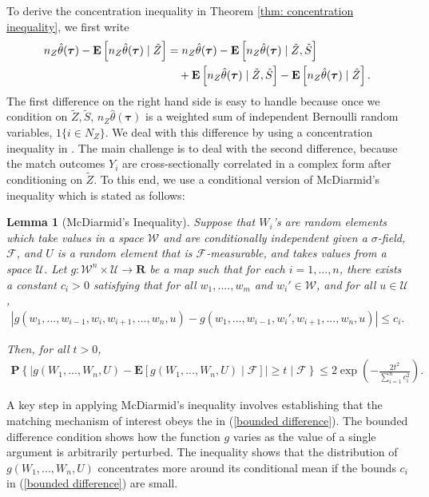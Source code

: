 \documentclass[12pt, fullpage]{amsart}
\newtheorem{lemma}{Lemma}[section]
\theoremstyle{definition}
\theoremstyle{definition}
\theoremstyle{definition}
\begin{document}
\begin{bibunit}[econometrica]
To derive the concentration inequality in Theorem \ref{thm: concentration inequality}, we first write 
\begin{align}
    \label{decomp}
    n_Z \hat \theta(\boldsymbol{\tau}) - \mathbf{E}\left[ n_Z \hat \theta(\boldsymbol{\tau})\mid \tilde Z \right] &= n_Z \hat \theta(\boldsymbol{\tau}) - \mathbf{E}\left[ n_Z \hat \theta(\boldsymbol{\tau})\mid \tilde Z,\tilde S \right]\\ \notag
    &\quad  + \mathbf{E}\left[ n_Z \hat \theta(\boldsymbol{\tau})\mid \tilde Z,\tilde S \right] - \mathbf{E}\left[ n_Z \hat \theta(\boldsymbol{\tau})\mid \tilde Z \right].
\end{align}
The first difference on the right hand side is easy to handle because once we condition on $\tilde Z,\tilde S$, $n_Z \hat \theta(\boldsymbol{\tau})$ is a weighted sum of independent Bernoulli random variables, $1\{i \in N_Z\}$. We deal with this difference by using a concentration inequality in \cite{Chung/Lu:AC:2002}. The main challenge is to deal with the second difference, because the match outcomes $Y_i$ are cross-sectionally correlated in a complex form after conditioning on $\tilde Z$. To this end, we use a conditional version of McDiarmid's inequality which is stated as follows:

\begin{lemma}[McDiarmid's Inequality]
	\label{lemm: McDiarmid's}
	Suppose that $W_i$'s are random elements which take values in a space $\mathcal{W}$ and are conditionally independent given a $\sigma$-field, $\mathcal{F}$, and $U$ is a random element that is $\mathcal{F}$-measurable, and takes values from a space $\mathcal{U}$. Let $g:\mathcal{W}^n \times \mathcal{U} \rightarrow \mathbf{R}$ be a map such that for each $i = 1,...,n$, there exists a constant $c_i>0$ satisfying that for all $w_1,....,w_m$ and $w_i' \in \mathcal{W}$, and for all $u \in \mathcal{U}$,
	\begin{align}
		\label{bounded difference}
		|g(w_1,...,w_{i-1},w_i,w_{i+1},...,w_n,u) - g(w_1,...,w_{i-1},w_i',w_{i+1},...,w_n,u)| \le c_i.
	\end{align}

	Then, for all $t>0$,
	\begin{align}
		\mathbf{P}\left\{\left|g(W_1,...,W_n,U) - \mathbf{E}[g(W_1,...,W_n,U) \mid \mathcal{F}]\right| \ge t \mid \mathcal{F}\right\} \le 2 \exp\left( - \frac{2 t^2}{\sum_{i=1}^n c_i^2}\right).
	\end{align}
\end{lemma}
A key step in applying McDiarmid's inequality involves establishing that the matching mechanism of interest obeys the  in (\ref{bounded difference}). The bounded difference condition shows how the function $g$ varies as the value of a single argument is arbitrarily perturbed. The inequality shows that the distribution of $g(W_1,...,W_n,U)$ concentrates more around its conditional mean if the bounds $c_i$ in (\ref{bounded difference}) are small.


\end{bibunit}
\end{document}
